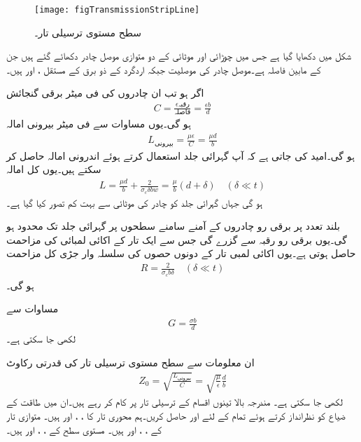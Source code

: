 \begin{figure}
\centering
\texttt{[image: figTransmissionStripLine]}
\caption{سطح مستوی ترسیلی تار۔}
\label{شکل_ترسیلی_سطح_مستوی}
\end{figure}

شکل  میں  دکھایا گیا ہے جس میں  چوڑائی اور  موٹائی کے دو متوازی موصل چادر دکھائے گئے ہیں جن کے مابین فاصلہ  ہے۔موصل چادر کی موصلیت  جبکہ اردگرد کے ذو برق کے مستقل ،  اور  ہیں۔

اگر  ہو تب ان چادروں کی فی میٹر برقی گنجائش  
\begin{align}
C=\frac{\epsilon \text{رقبہ}}{ \text{فاصلہ}} = \frac{\epsilon b}{d}
\end{align}
ہو گی۔یوں مساوات  سے فی میٹر بیرونی امالہ
\begin{align}
L_{\text{بیرونی}}=\frac{\mu \epsilon}{C}=\frac{\mu d}{b}
\end{align}
ہو گی۔امید کی جاتی ہے کہ آپ گہرائی جلد استعمال کرتے ہوئے اندرونی امالہ حاصل کر سکتے ہیں۔یوں کل امالہ
\begin{align}
L=\frac{\mu d}{b}+\frac{2}{\sigma_c \delta b w}=\frac{\mu}{b} (d+\delta) \quad (\delta \ll t)
\end{align}
ہو گی جہاں گہرائی جلد کو چادر کی موٹائی سے بہت کم تصور کیا گیا ہے۔

بلند تعدد پر برقی رو چادروں کے آمنے سامنے  سطحوں پر گہرائی جلد تک محدود ہو گی۔یوں برقی رو رقبہ  سے گزرے گی جس سے ایک تار کے اکائی لمبائی کی مزاحمت  حاصل ہوتی ہے۔یوں اکائی لمبی تار کے دونوں حصوں کی سلسلہ وار جڑی کل مزاحمت
\begin{align}
R=\frac{2}{\sigma_c b \delta} \quad (\delta \ll t)
\end{align}
ہو گی۔ 

مساوات  سے
\begin{align}
G=\frac{\sigma b}{d}
\end{align}
لکھی جا سکتی ہے۔

ان معلومات سے سطح مستوی ترسیلی تار کی قدرتی رکاوٹ
\begin{align}
Z_0=\sqrt{\frac{L_{\text{بیرونی}}}{C}}=\sqrt{\frac{\mu}{\epsilon}} \frac{d}{b}
\end{align}
لکھی جا سکتی ہے۔
مندرجہ بالا تینوں اقسام کے ترسیلی تار  پر کام کر رہے ہیں۔ان میں طاقت کے ضیاع کو نظرانداز کرتے ہوئے تمام کے لئے  اور  حاصل کریں۔ہم محوری تار کا ، ،  اور  ہیں۔ متوازی تار کے ، ،  اور  ہیں۔ مستوی سطح کے ، ،  اور  ہیں۔

